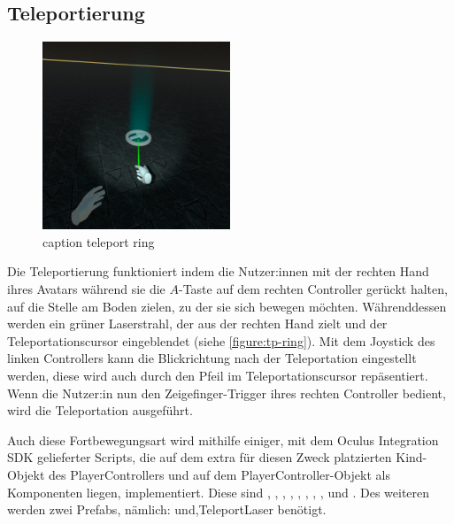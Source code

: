 \subsection{Teleportierung}\label{subsec:teleport-implementation}
\begin{figure}[!h]
    \centering
    \includegraphics[width=0.5\textwidth]{vrscreenshots/teleportring.jpg}
    \caption{caption teleport ring}\label{figure:tp-ring}
\end{figure}
    Die Teleportierung funktioniert indem die Nutzer:innen mit der rechten Hand ihres Avatars während sie die $A$-Taste auf dem rechten Controller gerückt halten, auf die Stelle am Boden zielen, zu der sie sich bewegen möchten. Währenddessen werden ein grüner Laserstrahl, der aus der rechten Hand zielt und der Teleportationscursor eingeblendet (siehe \autoref{figure:tp-ring}). Mit dem Joystick des linken Controllers kann die Blickrichtung nach der Teleportation eingestellt werden, diese wird auch durch den Pfeil im Teleportationscursor repäsentiert. Wenn die Nutzer:in nun den Zeigefinger-Trigger ihres rechten Controller bedient, wird die Teleportation ausgeführt.

    Auch diese Fortbewegungsart wird mithilfe einiger, mit dem Oculus Integration SDK gelieferter Scripts, die auf dem extra für diesen Zweck platzierten Kind-Objekt des PlayerControllers  und auf dem PlayerController-Objekt als Komponenten liegen, implementiert. Diese sind , , , , , , , , und . Des weiteren werden zwei Prefabs, nämlich:  und\textquote,{TeleportLaser} benötigt.

